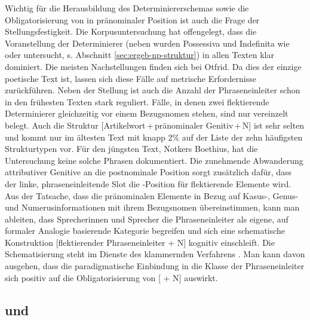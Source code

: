 Wichtig für die Herausbildung des Determiniererschemas sowie die Obligatorisierung von  in pränominaler Position ist auch die Frage der Stellungsfestigkeit. Die Korpusuntersuchung hat offengelegt, dass die Voranstellung der Determinierer (neben  wurden Possessiva und Indefinita wie  oder  untersucht, s. Abschnitt \ref{sec:ergeb-np-struktur}) in allen Texten klar dominiert. Die meisten Nachstellungen finden sich bei Otfrid. Da dies der einzige poetische Text ist, lassen sich diese Fälle auf metrische Erfordernisse zurückführen. Neben der Stellung ist auch die Anzahl der Phraseneinleiter schon in den frühesten Texten stark reguliert. Fälle, in denen zwei flektierende Determinierer gleichzeitig vor einem Bezugsnomen stehen, sind nur vereinzelt belegt. Auch die Struktur [Artikelwort\,+\,pränominaler Genitiv\,+\,N] ist sehr selten und kommt nur im ältesten Text mit knapp 2\% auf der Liste der zehn häufigsten Strukturtypen vor. Für den jüngsten Text, Notkers Boethius, hat die Untersuchung keine solche Phrasen dokumentiert. Die zunehmende Abwanderung attributiver Genitive an die postnominale Position sorgt zusätzlich dafür, dass der linke, phraseneinleitende Slot die -Position für flektierende Elemente wird. Aus der Tatsache, dass die pränominalen Elemente in Bezug auf Kasus-, Genus- und Numerusinformationen mit ihrem Bezugsnomen übereinstimmen, kann man ableiten, dass Sprecherinnen und Sprecher die Phraseneinleiter als eigene, auf formaler Analogie basierende Kategorie begreifen und sich eine schematische Konstruktion [flektierender Phraseneinleiter + N] kognitiv einschleift. Die Schematisierung steht im Dienste des klammernden Verfahrens \parencite{Ronneberger-Sibold1994,Ronneberger-Sibold2010a,Szczepaniak2010,Szczepaniak2011a,Flick2018}. Man kann davon ausgehen, dass die paradigmatische Einbindung in die Klasse der Phraseneinleiter sich positiv auf die Obligatorisierung von [ + N] auswirkt.     


\subsection{ und } \label{sec:disk-weg-block}

